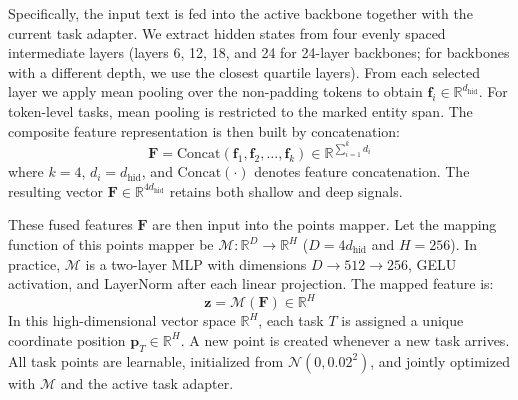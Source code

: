 \documentclass[11pt]{article}
\begin{document}
Specifically, the input text is fed into the active backbone together with the current task adapter. We extract hidden states from four evenly spaced intermediate layers (layers 6, 12, 18, and 24 for 24-layer backbones; for backbones with a different depth, we use the closest quartile layers). From each selected layer we apply mean pooling over the non-padding tokens to obtain $\mathbf{f}_i \in \mathbb{R}^{d_{\text{hid}}}$. For token-level tasks, mean pooling is restricted to the marked entity span. The composite feature representation is then built by concatenation:
\begin{equation}
\mathbf{F} = \text{Concat}(\mathbf{f}_{1}, \mathbf{f}_{2}, \dots, \mathbf{f}_{k}) \in \mathbb{R}^{\sum_{i=1}^k d_{i}}
\end{equation}
where $k=4$, $d_i=d_{\text{hid}}$, and $\text{Concat}(\cdot)$ denotes feature concatenation. The resulting vector $\mathbf{F} \in \mathbb{R}^{4d_{\text{hid}}}$ retains both shallow and deep signals.

These fused features $\mathbf{F}$ are then input into the points mapper. Let the mapping function of this points mapper be $\mathcal{M}: \mathbb{R}^D \to \mathbb{R}^H$ ($D = 4d_{\text{hid}}$ and $H = 256$). In practice, $\mathcal{M}$ is a two-layer MLP with dimensions $D \rightarrow 512 \rightarrow 256$, GELU activation, and LayerNorm after each linear projection. The mapped feature is:
\begin{equation}
\mathbf{z} = \mathcal{M}(\mathbf{F}) \in \mathbb{R}^H
\end{equation}
In this high-dimensional vector space $\mathbb{R}^H$, each task $T$ is assigned a unique coordinate position $\mathbf{p}_T \in \mathbb{R}^H$. A new point is created whenever a new task arrives. All task points are learnable, initialized from $\mathcal{N}(0, 0.02^2)$, and jointly optimized with $\mathcal{M}$ and the active task adapter.
\end{document}
